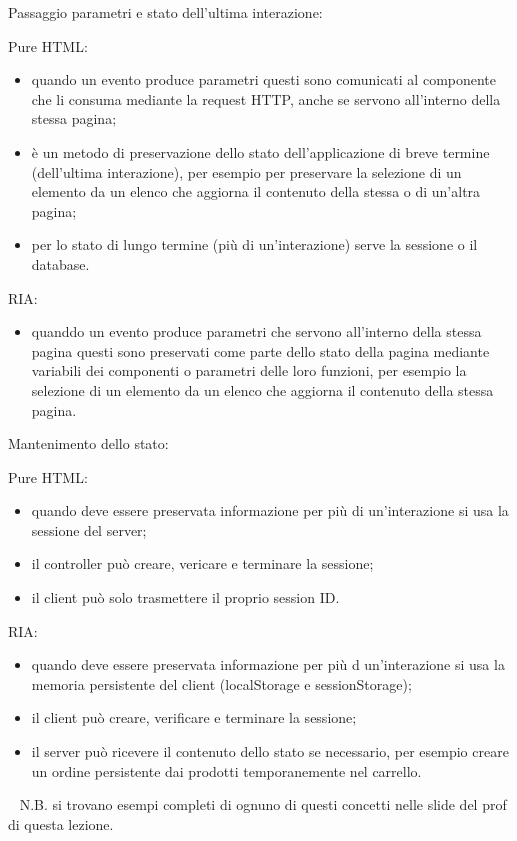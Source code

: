 Passaggio parametri e stato dell'ultima interazione:
\begin{multicols}{2}
Pure HTML:
\begin{itemize}
    \item quando un evento produce parametri questi sono comunicati al componente che li consuma mediante la request HTTP, anche se servono all'interno della stessa pagina;
    \item è un metodo di preservazione dello stato dell'applicazione di breve termine (dell'ultima interazione), per esempio per preservare la selezione di un elemento da un elenco che aggiorna il contenuto della stessa o di un'altra pagina;
    \item per lo stato di lungo termine (più di un'interazione) serve la sessione o il database. 
\end{itemize}
\vfill\null
\columnbreak
RIA:
\begin{itemize}
    \item quanddo un evento produce parametri che servono all'interno della stessa pagina questi sono preservati come parte dello stato della pagina mediante variabili dei componenti o parametri delle loro funzioni, per esempio la selezione di un elemento da un elenco che aggiorna il contenuto della stessa pagina.
\end{itemize}
\end{multicols}
Mantenimento dello stato:
\begin{multicols}{2}
Pure HTML:
\begin{itemize}
    \item quando deve essere preservata informazione per più di un'interazione si usa la sessione del server;
    \item il controller può creare, vericare e terminare la sessione;
    \item il client può solo trasmettere il proprio session ID.
\end{itemize}
\vfill\null
\columnbreak
RIA:
\begin{itemize}
    \item quando deve essere preservata informazione per più d un'interazione si usa la memoria persistente del client (localStorage e sessionStorage);
    \item il client può creare, verificare e terminare la sessione;
    \item il server può ricevere il contenuto dello stato se necessario, per esempio creare un ordine persistente dai prodotti temporanemente nel carrello.
\end{itemize}
\end{multicols}
\ \newline
N.B. si trovano esempi completi di ognuno di questi concetti nelle slide del prof di questa lezione.